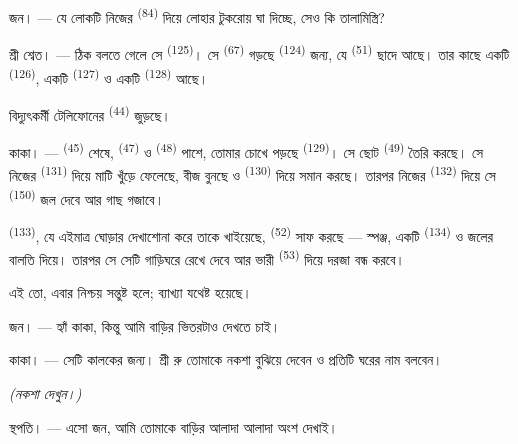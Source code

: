 \textsc{জন}। --- যে লোকটি নিজের  \textsuperscript{(84)} দিয়ে
লোহার টুকরোয় ঘা দিচ্ছে, সেও কি তালামিস্ত্রি?

\textsc{শ্রী শ্বেত}। --- ঠিক বলতে গেলে সে 
\textsuperscript{(125)}। সে  \textsuperscript{(67)} গড়ছে
 \textsuperscript{(124)} জন্য, যে 
\textsuperscript{(51)} ছাদে আছে। তার কাছে একটি 
\textsuperscript{(126)}, একটি  \textsuperscript{(127)} ও একটি
 \textsuperscript{(128)} আছে।

বিদ্যুৎকর্মী টেলিফোনের  \textsuperscript{(44)} জুড়ছে।

\VUsaut{3.0mm}

\textsc{কাকা}। ---  \textsuperscript{(45)} শেষে,
 \textsuperscript{(47)} ও 
\textsuperscript{(48)} পাশে, তোমার চোখে পড়ছে 
\textsuperscript{(129)}। সে ছোট  \textsuperscript{(49)} তৈরি
করছে। সে নিজের  \textsuperscript{(131)} দিয়ে মাটি খুঁড়ে
ফেলেছে, বীজ বুনছে ও  \textsuperscript{(130)} দিয়ে সমান করছে।
তারপর নিজের  \textsuperscript{(132)} দিয়ে সে 
\textsuperscript{(150)} জল দেবে আর গাছ গজাবে।

 \textsuperscript{(133)}, যে এইমাত্র ঘোড়ার দেখাশোনা করে তাকে
খাইয়েছে,  \textsuperscript{(52)} সাফ করছে --- স্পঞ্জ, একটি
 \textsuperscript{(134)} ও জলের বালতি দিয়ে। তারপর সে সেটি
গাড়িঘরে রেখে দেবে আর ভারী  \textsuperscript{(53)} দিয়ে দরজা বন্ধ
করবে।

এই তো, এবার নিশ্চয় সন্তুষ্ট হলে; ব্যাখ্যা যথেষ্ট হয়েছে।

\textsc{জন}। --- হ্যাঁ কাকা, কিন্তু আমি বাড়ির ভিতরটাও দেখতে চাই।

\textsc{কাকা}। --- সেটি কালকের জন্য। শ্রী রু তোমাকে নকশা বুঝিয়ে দেবেন ও
প্রতিটি ঘরের নাম বলবেন।

\VUsaut{3.0mm}
\VUsaut{2.4mm}

{\centering\textit{(নকশা দেখুন।)}\par}
\VUsaut{2.4mm}

\textsc{স্থপতি}। --- এসো জন, আমি তোমাকে বাড়ির আলাদা আলাদা অংশ দেখাই।

